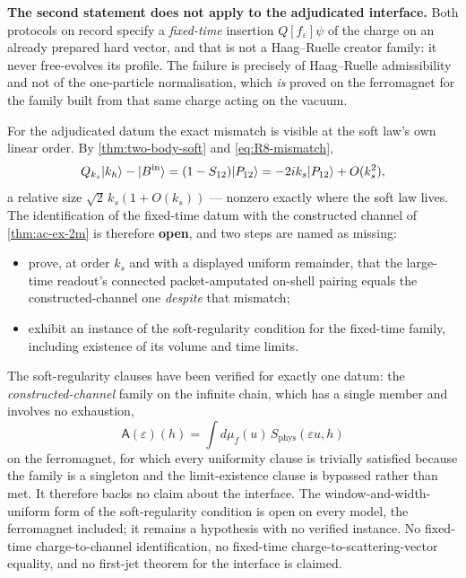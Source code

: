 \begin{scope}
\textbf{The second statement does not apply to the adjudicated interface.}
Both protocols on record specify a \emph{fixed-time} insertion
$Q[f_\varepsilon]\psi$ of the charge on an already prepared hard vector, and
that is not a Haag--Ruelle creator family: it never free-evolves its profile.
The failure is precisely of Haag--Ruelle admissibility and not of the
one-particle normalisation, which \emph{is} proved on the ferromagnet for the
family built from that same charge acting on the vacuum.

For the adjudicated datum the exact mismatch is visible at the soft law's own
linear order. By \cref{thm:two-body-soft} and \cref{eq:R8-mismatch},
\begin{equation}
  Q_{k_s}|k_h\rangle-|B^{\mathrm{in}}\rangle
   =(1-S_{12})|P_{12}\rangle
   =-2ik_s|P_{12}\rangle+O(k_s^2),
\end{equation}
a relative size $\sqrt2\,k_s(1+O(k_s))$ --- nonzero exactly where the soft law
lives. The identification of the fixed-time datum with the constructed channel
of \cref{thm:ac-ex-2m} is therefore \textbf{open}, and two steps are named as
missing:
\begin{itemize}
\item[(i)] prove, at order $k_s$ and with a displayed uniform remainder, that
  the large-time readout's connected packet-amputated on-shell pairing equals
  the constructed-channel one \emph{despite} that mismatch;
\item[(ii)] exhibit an instance of the soft-regularity condition for the
  fixed-time family, including existence of its volume and time limits.
\end{itemize}
The soft-regularity clauses have been verified for exactly one datum: the
\emph{constructed-channel} family on the infinite chain, which has a single
member and involves no exhaustion,
\begin{equation}
  \mathsf{A}(\varepsilon)(h)
   =\int d\mu_f(u)\,S_{\mathrm{phys}}(\varepsilon u,h)
\end{equation}
on the ferromagnet, for which every uniformity clause is trivially satisfied
because the family is a singleton and the limit-existence clause is bypassed
rather than met. It therefore backs no claim about the interface. The
window-and-width-uniform form of the soft-regularity condition is open on
every model, the ferromagnet included; it remains a hypothesis with no
verified instance. No fixed-time charge-to-channel identification, no
fixed-time charge-to-scattering-vector equality, and no first-jet theorem for
the interface is claimed.
\end{scope}
